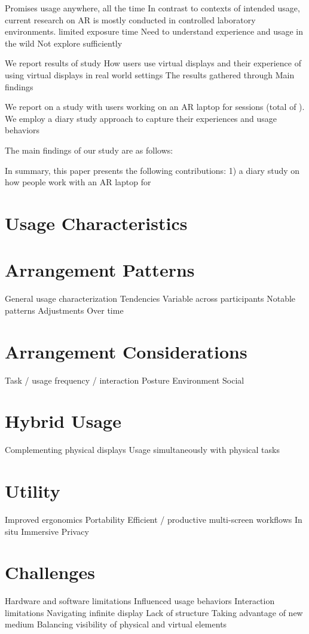 Promises usage anywhere, all the time
In contrast to contexts of intended usage, current research on AR is mostly conducted in controlled laboratory environments. 
limited exposure time 
Need to understand experience and usage in the wild 
Not explore sufficiently 

We report results of study
How users use virtual displays and their experience of using virtual displays in real world settings 
The results gathered through 
Main findings

We report on a study with users working on an AR laptop for sessions (total of ).
We employ a diary study approach to capture their experiences and usage behaviors

The main findings of our study are as follows: 

In summary, this paper presents the following contributions: 
1) a diary study on how people work with an AR laptop for 



\section{Usage Characteristics}

\section{Arrangement Patterns}
General usage characterization
Tendencies
Variable across participants 
Notable patterns 
Adjustments 
Over time 

\section{Arrangement Considerations}
Task / usage frequency / interaction
Posture
Environment
Social

\section{Hybrid Usage}
Complementing physical displays 
Usage simultaneously with physical tasks 

\section{Utility}
Improved ergonomics 
Portability 
Efficient / productive multi-screen workflows
In situ 
Immersive 
Privacy

\section{Challenges}
Hardware and software limitations 
Influenced usage behaviors 
Interaction limitations 
Navigating infinite display 
Lack of structure 
Taking advantage of new medium 
Balancing visibility of physical and virtual elements


